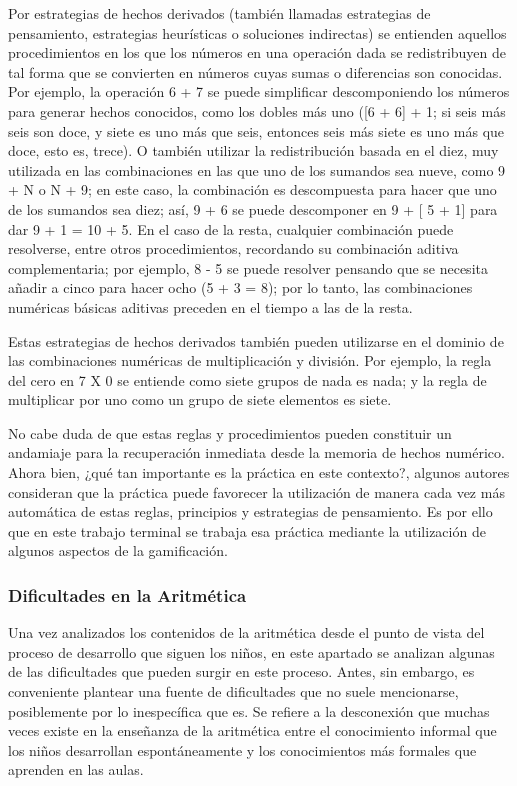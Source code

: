 \documentclass{article}
\begin{document}
Por estrategias de hechos derivados (también llamadas estrategias de pensamiento, estrategias heurísticas o soluciones indirectas) se entienden aquellos procedimientos en los que los números en una operación dada se redistribuyen de tal forma que se convierten en números cuyas sumas o diferencias son conocidas. Por ejemplo, la operación 6 + 7 se puede simplificar descomponiendo los números para generar hechos conocidos, como los dobles más uno ([6 + 6] + 1; si seis más seis son doce, y siete es uno más que seis, entonces seis más siete es uno más que doce, esto es, trece). O también utilizar la redistribución basada en el diez, muy utilizada en las combinaciones en las que uno de los sumandos sea nueve, como 9 + N o N + 9; en este caso, la combinación es descompuesta para hacer que uno de los sumandos sea diez; así, 9 + 6 se puede descomponer en 9 + [ 5 + 1] para dar 9 + 1 = 10 + 5. En el caso de la resta, cualquier combinación puede resolverse, entre otros procedimientos, recordando su combinación aditiva complementaria; por ejemplo, 8 - 5 se puede resolver pensando que se necesita añadir a cinco para hacer ocho (5 + 3 = 8); por lo tanto, las combinaciones numéricas básicas aditivas preceden en el tiempo a las de la resta.

Estas estrategias de hechos derivados también pueden utilizarse en el dominio de las combinaciones numéricas de multiplicación y división. Por ejemplo, la regla del cero en 7 X 0 se entiende como siete grupos de nada es nada; y la regla de multiplicar por uno como un grupo de siete elementos es siete.

No cabe duda de que estas reglas y procedimientos pueden constituir un andamiaje para la recuperación inmediata desde la memoria de hechos numérico. Ahora bien, ¿qué tan importante es la práctica en este contexto?, algunos autores \cite{orrantia2002dificultades} consideran que  la práctica  puede favorecer la utilización de manera cada vez más automática de estas reglas, principios y estrategias de pensamiento. Es por ello que en este trabajo terminal se trabaja esa práctica mediante la utilización de algunos aspectos de la gamificación.

\subsubsection{Dificultades en la Aritmética} 
Una vez analizados los contenidos de la aritmética desde el punto de vista del proceso de desarrollo que siguen los niños, en este apartado se analizan algunas de las dificultades que pueden surgir en este proceso. Antes, sin embargo, es conveniente  plantear una fuente de dificultades que no suele mencionarse, posiblemente por lo inespecífica que es. Se refiere a la desconexión que muchas veces existe en la enseñanza de la aritmética entre el conocimiento informal que los niños desarrollan espontáneamente y los conocimientos más formales que aprenden en las aulas.
\end{document}
